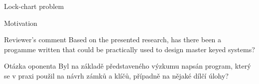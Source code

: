 \begin{frame}{Lock-chart problem}
\begin{minipage}[t][180pt][t]{\textwidth}
  \end{minipage}
\end{frame}

\begin{frame}{Motivation}
  \begin{block}{Reviewer's comment}
    Based on the presented research,
    has there been a progamme written
    that could be practically used
    to design master keyed systems?
  \end{block}
  \begin{block}{Otázka oponenta}
    Byl na základě představeného výzkumu napsán program,
    který se v praxi použil na návrh zámků a klíčů,
    případně na nějaké dílčí úlohy?
  \end{block}
\end{frame}


